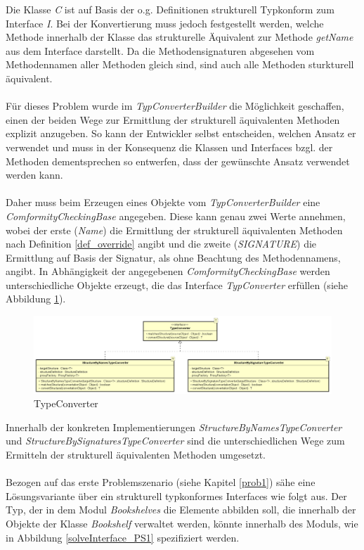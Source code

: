 \documentclass[11pt, 
ngerman,
doublespacing,
chapterinoneline, %
consistentlayout, %
]{scrartcl}
\begin{document}
Die Klasse \emph{C} ist auf Basis der o.g. Definitionen strukturell Typkonform zum Interface \emph{I}. Bei der Konvertierung muss jedoch festgestellt werden, welche Methode innerhalb der Klasse das strukturelle Äquivalent zur Methode \emph{getName} aus dem Interface darstellt. Da die Methodensignaturen abgesehen vom Methodennamen aller Methoden gleich sind, sind auch alle Methoden sturkturell äquivalent.\\\\
Für dieses Problem wurde im \emph{TypConverterBuilder} die Möglichkeit geschaffen, einen der beiden Wege zur Ermittlung der strukturell äquivalenten Methoden explizit anzugeben. So kann der Entwickler selbst entscheiden, welchen Ansatz er verwendet und muss in der Konsequenz die Klassen und Interfaces bzgl. der Methoden dementsprechen so entwerfen, dass der gewünschte Ansatz verwendet werden kann.\\\\
Daher muss beim Erzeugen eines Objekte vom \emph{TypConverterBuilder} eine \emph{ComformityCheckingBase} angegeben. Diese kann genau zwei Werte annehmen, wobei der erste (\emph{Name}) die Ermittlung der strukturell äquivalenten Methoden nach Definition \ref{def_override} angibt und die zweite (\emph{SIGNATURE}) die Ermittlung auf Basis der Signatur, als ohne Beachtung des Methodennamens, angibt. In Abhängigkeit der angegebenen \emph{ComformityCheckingBase} werden unterschiedliche Objekte erzeugt, die das Interface \emph{TypConverter} erfüllen (siehe Abbildung \ref{cd_typeConverter}).
\begin{figure}[h]
\centering
\includegraphics[scale=0.25]{pics/cd_typeConverter.png}
\caption{TypeConverter}
\label{cd_typeConverter}
\end{figure}
Innerhalb der konkreten Implementierungen \emph{StructureByNamesTypeConverter} und \emph{StructureBySignaturesTypeConverter} sind die unterschiedlichen Wege zum Ermitteln der strukturell äquivalenten Methoden umgesetzt.\\\\
Bezogen auf das erste Problemszenario (siehe Kapitel \ref{prob1}) sähe eine Lösungsvariante über ein strukturell typkonformes Interfaces wie folgt aus. Der Typ, der in dem Modul \emph{Bookshelves} die Elemente abbilden soll, die innerhalb der Objekte der Klasse \emph{Bookshelf} verwaltet werden, könnte innerhalb des Moduls, wie in Abbildung \ref{solveInterface_PS1} spezifiziert werden.
\end{document}
